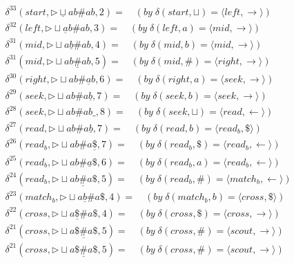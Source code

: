 \documentclass[14pt]{extarticle}
\begin{document}
\begin{align*}
    \delta^{33}(start, \triangleright \underline{\sqcup} ab \# ab, 2) = \quad (by \; \delta(start, \sqcup) = \langle left, \rightarrow \rangle) \\
    \delta^{32}(left, \triangleright \sqcup \underline{a} b \# ab, 3) = \quad (by \; \delta(left, a) = \langle mid, \rightarrow \rangle) \\
    \delta^{31}(mid, \triangleright \sqcup a\underline{b} \# ab, 4) = \quad (by \; \delta(mid, b) = \langle mid, \rightarrow \rangle) \\
    \delta^{31}(mid, \triangleright \sqcup ab\underline{\#} ab, 5) = \quad (by \; \delta(mid, \#) = \langle right, \rightarrow \rangle) \\
    \delta^{30}(right, \triangleright \sqcup ab \# \underline{a}b, 6) = \quad (by \; \delta(right, a) = \langle seek, \rightarrow \rangle) \\
    \delta^{29}(seek, \triangleright \sqcup ab \# a\underline{b}, 7) = \quad (by \; \delta(seek, b) = \langle seek, \rightarrow \rangle) \\
    \delta^{28}(seek, \triangleright \sqcup ab \# ab\_, 8) = \quad (by \; \delta(seek, \sqcup) = \langle read, \leftarrow \rangle) \\
    \delta^{27}(read, \triangleright \sqcup ab \# a\underline{b}, 7) = \quad (by \; \delta(read, b) = \langle read_b, \$ \rangle) \\
    \delta^{26}(read_b, \triangleright \sqcup ab \# a\underline{\$}, 7) = \quad (by \; \delta(read_b, \$) = \langle read_b, \leftarrow \rangle) \\
    \delta^{25}(read_b, \triangleright \sqcup ab \# \underline{a}\$, 6) = \quad (by \; \delta(read_b, a) = \langle read_b, \leftarrow \rangle) \\
    \delta^{24}(read_b, \triangleright \sqcup ab \underline{\#} a\$, 5) = \quad (by \; \delta(read_b, \#) = \langle match_b, \leftarrow \rangle) \\
    \delta^{23}(match_b, \triangleright \sqcup a\underline{b} \# a\$, 4) = \quad (by \; \delta(match_b, b) = \langle cross, \$ \rangle) \\
    \delta^{22}(cross, \triangleright \sqcup a\underline{\$} \# a\$, 4) = \quad (by \; \delta(cross, \$) = \langle cross, \rightarrow \rangle) \\
    \delta^{21}(cross, \triangleright \sqcup a\$ \underline{\#} a\$, 5) = \quad (by \; \delta(cross, \#) = \langle scout, \rightarrow \rangle) \\
    \delta^{21}(cross, \triangleright \sqcup a\$ \underline{\#} a\$, 5) = \quad (by \; \delta(cross, \#) = \langle scout, \rightarrow \rangle) \\

\end{align*}
\end{document}
